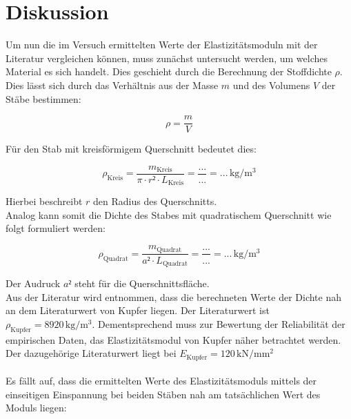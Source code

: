 


\section{Diskussion}
\label{sec:Diskussion}

Um nun die im Versuch ermittelten Werte der Elastizitätsmoduln mit der Literatur vergleichen können, muss
zunächst untersucht werden, um welches Material es sich handelt. Dies geschieht durch die Berechnung der Stoffdichte $\rho$.
Dies lässt sich durch das Verhältnis aus der Masse $m$ und des Volumens $V$ der Stäbe bestimmen:

\begin{equation*}
    \rho = \frac{m}{V}
\end{equation*}

\noindent Für den Stab mit kreisförmigem Querschnitt bedeutet dies:

\begin{equation}
    \rho_\text{Kreis} = \frac{m_\text{Kreis}}{\pi\cdot r²\cdot L_\text{Kreis}} = \frac{...}{...} = ...\,\unit{\kilo\gram\per\cubic\meter}
\end{equation}

\noindent Hierbei beschreibt $r$ den Radius des Querschnitts.\\
Analog kann somit die Dichte des Stabes mit quadratischem Querschnitt wie folgt formuliert werden:

\begin{equation}
    \rho_\text{Quadrat} = \frac{m_\text{Quadrat}}{a²\cdot L_\text{Quadrat}} = \frac{...}{...} = ...\,\unit{\kilo\gram\per\cubic\meter}
\end{equation}

\noindent Der Audruck $a²$ steht für die Querschnittsfläche.\\
Aus der Literatur \cite{Dichte_Kupfer} wird entnommen, dass die berechneten Werte der Dichte nah an dem Literaturwert von Kupfer liegen.
Der Literaturwert ist $\rho_\text{Kupfer} = 8920\,\unit{\kilo\gram\per\cubic\meter}$. Dementsprechend muss zur Bewertung der Reliabilität der
empirischen Daten, das Elastizitätsmodul von Kupfer näher betrachtet werden. Der dazugehörige Literaturwert \cite{Modul_Kupfer} liegt bei
$E_\text{Kupfer} = 120\,\unit{\kilo\newton\per\milli\meter\squared}$\\\\

\noindent Es fällt auf, dass die ermittelten Werte des Elastizitätsmoduls mittels der einseitigen Einspannung bei beiden Stäben nah am 
tatsächlichen Wert des Moduls liegen:

